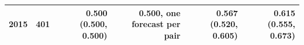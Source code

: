\begin{tabular}{lrrrrr}
2015 & 401 & 0.500 (0.500, 0.500) & 0.500, one forecast per pair & 0.567 (0.520, 0.605) & 0.615 (0.555, 0.673) \\
\bottomrule
\end{tabular}
